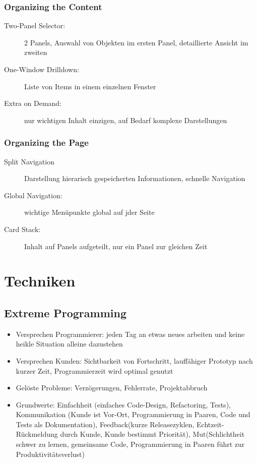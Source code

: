 \documentclass[11pt, fleqn, a4paper, leqno]{scrartcl} %
\begin{document}
			\subsubsection{Organizing the Content}
				\begin{description}
					\item[Two-Panel Selector:] 2 Panels, Auswahl von Objekten im ersten Panel, detaillierte Ansicht im zweiten
					\item[One-Window Drilldown:] Liste von Items in einem einzelnen Fenster
					\item[Extra on Demand:] nur wichtigen Inhalt einzigen, auf Bedarf komplexe Darstellungen
				\end{description}
			\subsubsection{Organizing the Page}
				\begin{description}
					\item [Split Navigation] Darstellung hierarisch gespeicherten Informationen, schnelle Navigation
					\item[Global Navigation:] wichtige Menüpunkte global auf jder Seite
					\item[Card Stack:] Inhalt auf Panels aufgeteilt, nur ein Panel zur gleichen Zeit
				\end{description}
	\section{Techniken}
		\subsection{Extreme Programming}
			\begin{itemize}
				\item Versprechen Programmierer: jeden Tag an etwas neues arbeiten und keine heikle Situation alleine dazustehen
				\item Versprechen Kunden: Sichtbarkeit von Fortschritt, lauffähiger Prototyp nach kurzer Zeit, Programmierzeit wird optimal genutzt 
				\item Gelöste Probleme: Verzögerungen, Fehlerrate, Projektabbruch
				\item Grundwerte: Einfachheit (einfaches Code-Design, Refactoring, Tests), Kommunikation (Kunde ist Vor-Ort, Programmierung in Paaren, Code und Tests als Dokumentation), Feedback(kurze Releasezyklen, Echtzeit-Rückmeldung durch Kunde, Kunde bestimmt Priorität), Mut(Schlichtheit schwer zu lernen, gemeinsame Code, Programmierung in Paaren führt zur Produktivitätsverlust)
			\end{itemize}
\end{document}
